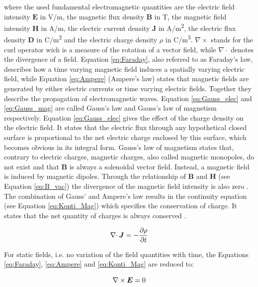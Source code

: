 where the used fundamental electromagnetic quantities are the electric field intensity $\boldsymbol{E}$ in V/m, the magnetic flux density $\boldsymbol{B}$ in T, the magnetic field intensity $\boldsymbol{H}$ in A/m, the electric current density $\boldsymbol{J}$ in A/m\textsuperscript{2}, the electric flux density $\boldsymbol{D}$ in C/m\textsuperscript{2} and the electric charge density $\rho$ in C/m\textsuperscript{3}. $\nabla\times$ stands for the curl operator wich is a measure of the rotation of a vector field, while $\nabla\cdotp$ denotes the divergence of a field. Equation \ref{eq:Faraday}, also referred to as Faraday's law, describes how a time varying magnetic field induces a spatially varying electric field, while Equation \ref{eq:Ampere} (Ampere's law) states that magnetic fields are generated by either electric currents or time varying electric fields. Together they describe the propagation of electromagnetic waves. Equation \ref{eq:Gauss_elec} and \ref{eq:Gauss_mag} are called Gauss's law and Gauss's law of magnetism respectively. Equation \ref{eq:Gauss_elec} gives the effect of the charge density on the electric field. It states that the electric flux through any hypothetical closed surface is proportional to the net electric charge enclosed by this surface, which becomes obvious in its integral form. Gauss's law of magnetism states that, contrary to electric charges, magnetic charges, also called magnetic monopoles, do not exist and that $\boldsymbol{B}$ is always a solenoidal vector field. Instead, a magnetic field is induced by magnetic dipoles. Through the relationship of $\boldsymbol{B}$ and $\boldsymbol{H}$ (see Equation \ref{eq:B_vac}) the divergence of the magnetic field intensity is also zero \cite{monk2003finite}\cite{kallenbach2018elektromagnete}.
The combination of Gauss' and Ampere's law results in the continuity equation (see Equation \ref{eq:Konti_Mag}) which specifies the conservation of charge. It states that the net quantity of charges is always conserved \cite{monk2003finite}\cite{meschede2015gerthsen}\cite{schwab2013begriffswelt}.   

\begin{equation}
\label{eq:Konti_Mag}
\centering
\nabla\cdotp\boldsymbol{J} = -\frac{\partial\rho}{\partial t}
\end{equation}

For static fields, i.e. no variation of the field quantities with time, the Equations \ref{eq:Faraday}, \ref{eq:Ampere} and \ref{eq:Konti_Mag} are reduced to:

\begin{equation}
\label{eq:Faraday_stat}
\centering
\nabla\times\boldsymbol{E} = 0
\end{equation}


